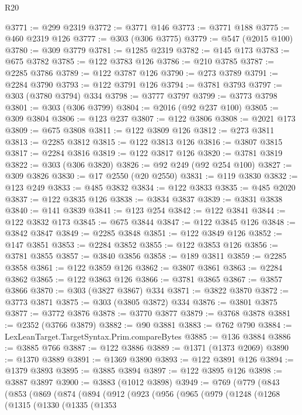 \begin{lexlean}{R20}
\begin{coremodule}
@3771 := @299 @2319
@3772 := @3771 @146
@3773 := @3771 @188
@3775 := @460 @2319 @126
@3777 := @303 (@306 @3775)
@3779 := @547 (@2015 @100)
@3780 := @309 @3779
@3781 := @1285 @2319
@3782 := @145 @173
@3783 := @675 @3782
@3785 := @122 @3783 @126
@3786 := @210 @3785
@3787 := @2285 @3786
@3789 := @122 @3787 @126
@3790 := @273 @3789
@3791 := @2284 @3790
@3793 := @122 @3791 @126
@3794 := @3781 @3793
@3797 := @303 (@3780 @3794) @334
@3798 := @3777 @3797
@3799 := @3773 @3798
@3801 := @303 (@306 @3799)
@3804 := @2016 (@92 @237 @100)
@3805 := @309 @3804
@3806 := @123 @237
@3807 := @122 @3806
@3808 := @2021 @173
@3809 := @675 @3808
@3811 := @122 @3809 @126
@3812 := @273 @3811
@3813 := @2285 @3812
@3815 := @122 @3813 @126
@3816 := @3807 @3815
@3817 := @2284 @3816
@3819 := @122 @3817 @126
@3820 := @3781 @3819
@3822 := @303 (@306 @3820)
@3826 := @92 @249 (@92 @254 @100)
@3827 := @309 @3826
@3830 := @17 @2550 (@20 @2550)
@3831 := @119 @3830
@3832 := @123 @249
@3833 := @485 @3832
@3834 := @122 @3833
@3835 := @485 @2020
@3837 := @122 @3835 @126
@3838 := @3834 @3837
@3839 := @3831 @3838
@3840 := @141 @3839
@3841 := @123 @254
@3842 := @122 @3841
@3844 := @122 @3832 @173
@3845 := @675 @3844
@3847 := @122 @3845 @126
@3848 := @3842 @3847
@3849 := @2285 @3848
@3851 := @122 @3849 @126
@3852 := @147 @3851
@3853 := @2284 @3852
@3855 := @122 @3853 @126
@3856 := @3781 @3855
@3857 := @3840 @3856
@3858 := @189 @3811
@3859 := @2285 @3858
@3861 := @122 @3859 @126
@3862 := @3807 @3861
@3863 := @2284 @3862
@3865 := @122 @3863 @126
@3866 := @3781 @3865
@3867 := @3857 @3866
@3870 := @303 (@3827 @3867) @334
@3871 := @3822 @3870
@3872 := @3773 @3871
@3875 := @303 (@3805 @3872) @334
@3876 := @3801 @3875
@3877 := @3772 @3876
@3878 := @3770 @3877
@3879 := @3768 @3878
@3881 := @2352 (@3766 @3879)
@3882 := @90 @3881
@3883 := @762 @790
@3884 := LexLeanTarget.TargetSyntax.Prim.compareBytes
@3885 := @136 @3884
@3886 := @3885 @766
@3887 := @122 @3886
@3889 := @1371 (@1373 @2069)
@3890 := @1370 @3889
@3891 := @1369 @3890
@3893 := @122 @3891 @126
@3894 := @1379 @3893
@3895 := @3885 @3894
@3897 := @122 @3895 @126
@3898 := @3887 @3897
@3900 := @3883 (@1012 @3898)
@3949 := @769
    (@779
      (@843
        (@853
          (@869
            (@874
              (@894
                (@912
                  (@923
                    (@956
                      (@965
                        (@979
                          (@1248
                            (@1268
                              (@1315
                                (@1330
                                  (@1335
                                    (@1353

\end{coremodule}
\end{lexlean}
